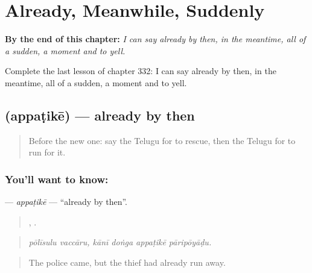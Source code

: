 
\chapter{Already, Meanwhile, Suddenly}
\label{ch:te-already-meanwhile-suddenly}

\begin{chapteropening}
\textbf{By the end of this chapter:} \emph{I can say already by then, in the meantime, all of a sudden, a moment and to yell.}

Complete the last lesson of chapter 332: I can say already by then, in the meantime, all of a sudden, a moment and to yell.
\end{chapteropening}

\section[\texorpdfstring{\te{అప్పటికే} (appaṭikē)}{అప్పటికే (appaṭikē)}]{ (appaṭikē) — already by then}

\label{lesson:TE-C332-appatike}



\begin{quote}
Before the new one: say the Telugu for to rescue, then the Telugu for to run for it.
\end{quote}

\subsection*{You'll want to know: }
\textbf{} — \emph{appaṭikē} — \textquotedblleft{}already by then\textquotedblright{}.

\begin{quote}
 ,    .
\end{quote}

\begin{quote}
\emph{pōlīsulu vaccāru, kānī doṅga appaṭikē pāripōyāḍu.}
\end{quote}

\begin{quote}
The police came, but the thief had already run away.
\end{quote}

